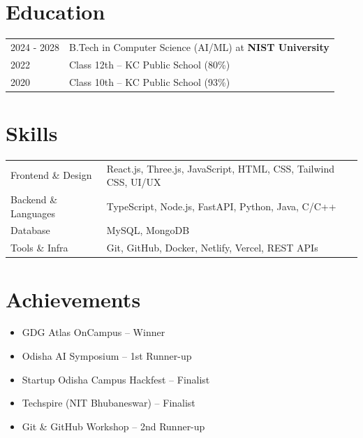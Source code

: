 \documentclass[a4paper,12pt]{article}
\begin{document}

\section{Education}
\begin{tabularx}{\linewidth}{@{}l X@{}}

2024 - 2028 & B.Tech in Computer Science (AI/ML) at \textbf{NIST University} \\

2022 & Class 12th -- KC Public School \hfill (80\%) \\

2020 & Class 10th -- KC Public School \hfill (93\%) \\

\end{tabularx}


\section{Skills}
\begin{tabularx}{\linewidth}{@{}l X@{}}

Frontend \& Design & React.js, Three.js, JavaScript, HTML, CSS, Tailwind CSS, UI/UX \\

Backend \& Languages & TypeScript, Node.js, FastAPI, Python, Java, C/C++ \\  

Database & MySQL, MongoDB \\  

Tools \& Infra & Git, GitHub, Docker, Netlify, Vercel, REST APIs \\  

\end{tabularx}


\section{Achievements}

\begin{itemize}
\item GDG Atlas OnCampus -- Winner
\item Odisha AI Symposium -- 1st Runner-up
\item Startup Odisha Campus Hackfest -- Finalist
\item Techspire (NIT Bhubaneswar) -- Finalist
\item Git \& GitHub Workshop -- 2nd Runner-up
\end{itemize}
\end{document}

